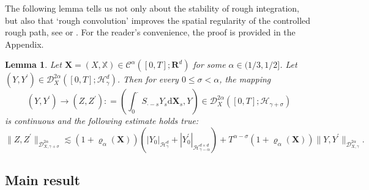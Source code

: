 \documentclass[10pt,a4paper]{article}
\newtheorem{lemma}{Lemma}[section]
\numberwithin{equation}{section}
\begin{document}
The following lemma tells us not only about the stability of rough integration, but also that `rough convolution' improves the spatial regularity of the controlled rough path, see \cite[Lemma 3.4]{HN22} or \cite[Corollary 4.6]{GHN21}. For the reader's convenience, the proof is provided in the Appendix.



\begin{lemma} \label{stab}
Let $\mathbf{X}=(X,\mathbb{X}) \in \mathscr{C}^{\alpha}([0,T];\mathbf{R}^{d})$ for some $\alpha \in (1/3, 1/2]$. Let $(Y,Y^{\prime}) \in \mathcal{D}_{X}^{2\alpha}([0,T];\mathcal{H}_{\gamma}^d)$. Then for every $0 \leq \sigma < \alpha$, the mapping
$$
(Y,Y^{\prime}) \to (Z,Z^{\prime}): = \left( \int_{0}^{\cdot} S_{\cdot-s} Y_{s} \mathrm{d}\mathbf{X}_{s}, Y \right) \in \mathcal D_{X}^{2\alpha} ([0,T];\mathcal{H}_{\gamma+\sigma})
$$
is continuous and the following estimate holds true:
\begin{equation}\label{Int}
\|Z,Z^{\prime}\|_{\mathcal{D}_{X,\gamma+\sigma}^{2\alpha}} \lesssim \left(1+\varrho_{\alpha}(\mathbf{X}) \right) \left(|Y_{0}|_{\mathcal H_{\gamma}^d} +|Y_{0}^\prime|_{\mathcal H_{\gamma-\alpha}^{d \times d}} \right)+ T^{\alpha - \sigma} \left(1+\varrho_{\alpha}(\mathbf{X}) \right) \|Y,Y^{\prime}\|_{\mathcal{D}_{X,\gamma}^{2\alpha}}.
\end{equation}
\end{lemma}








\subsection{Main result}\label{AP}
\end{document}
